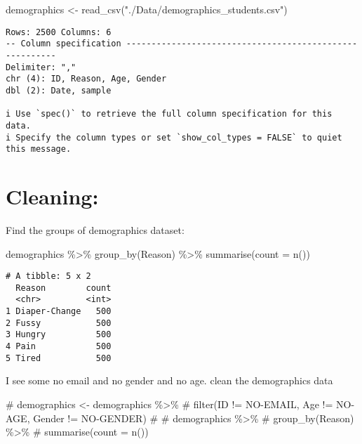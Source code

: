 \documentclass[
  letterpaper,
  DIV=11,
  numbers=noendperiod]{scrartcl}
\newenvironment{Shaded}{\begin{snugshade}}{\end{snugshade}}
\newcommand{\AttributeTok}[1]{\textcolor[rgb]{0.40,0.45,0.13}{#1}}
\newcommand{\CommentTok}[1]{\textcolor[rgb]{0.37,0.37,0.37}{#1}}
\newcommand{\FunctionTok}[1]{\textcolor[rgb]{0.28,0.35,0.67}{#1}}
\newcommand{\NormalTok}[1]{\textcolor[rgb]{0.00,0.23,0.31}{#1}}
\newcommand{\OtherTok}[1]{\textcolor[rgb]{0.00,0.23,0.31}{#1}}
\newcommand{\SpecialCharTok}[1]{\textcolor[rgb]{0.37,0.37,0.37}{#1}}
\newcommand{\StringTok}[1]{\textcolor[rgb]{0.13,0.47,0.30}{#1}}
\begin{document}
\begin{Shaded}
\begin{Highlighting}[]
\NormalTok{demographics }\OtherTok{\textless{}{-}} \FunctionTok{read\_csv}\NormalTok{(}\StringTok{"./Data/demographics\_students.csv"}\NormalTok{)}
\end{Highlighting}
\end{Shaded}

\begin{verbatim}
Rows: 2500 Columns: 6
-- Column specification --------------------------------------------------------
Delimiter: ","
chr (4): ID, Reason, Age, Gender
dbl (2): Date, sample

i Use `spec()` to retrieve the full column specification for this data.
i Specify the column types or set `show_col_types = FALSE` to quiet this message.
\end{verbatim}

\section{Cleaning:}\label{cleaning}

Find the groups of demographics dataset:

\begin{Shaded}
\begin{Highlighting}[]
\NormalTok{demographics }\SpecialCharTok{\%\textgreater{}\%}
  \FunctionTok{group\_by}\NormalTok{(Reason) }\SpecialCharTok{\%\textgreater{}\%}
  \FunctionTok{summarise}\NormalTok{(}\AttributeTok{count =} \FunctionTok{n}\NormalTok{())}
\end{Highlighting}
\end{Shaded}

\begin{verbatim}
# A tibble: 5 x 2
  Reason        count
  <chr>         <int>
1 Diaper-Change   500
2 Fussy           500
3 Hungry          500
4 Pain            500
5 Tired           500
\end{verbatim}

I see some no email and no gender and no age. clean the demographics
data

\begin{Shaded}
\begin{Highlighting}[]
\CommentTok{\# demographics \textless{}{-} demographics \%\textgreater{}\%}
\CommentTok{\#   filter(ID != \textquotesingle{}NO{-}EMAIL\textquotesingle{}, Age != \textquotesingle{}NO{-}AGE\textquotesingle{}, Gender != \textquotesingle{}NO{-}GENDER\textquotesingle{})}
\CommentTok{\# }
\CommentTok{\# demographics \%\textgreater{}\%}
\CommentTok{\#   group\_by(Reason) \%\textgreater{}\%}
\CommentTok{\#   summarise(count = n())}
\end{Highlighting}
\end{Shaded}
\end{document}
